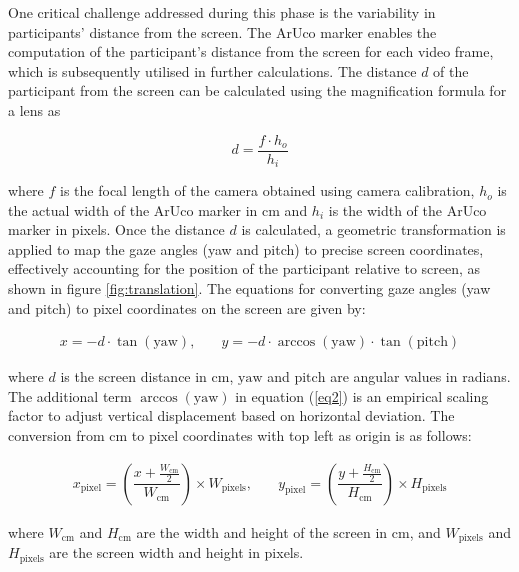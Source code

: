 \documentclass[10pt,a4paper,twoside]{article}
\begin{document}
One critical challenge addressed during this phase is the variability in participants' distance from the screen. The ArUco marker enables the computation of the participant's distance from the screen for each video frame, which is subsequently utilised in further calculations. The distance $d$ of the participant from the screen can be calculated using the magnification formula for a lens as

\begin{equation}
\label{eq1}
    d = \frac{f \cdot h_o}{h_i}
\end{equation}

where $f$ is the focal length of the camera obtained using camera calibration, $h_o$ is the actual width of the ArUco marker in cm and $h_i$ is the width of the ArUco marker in pixels. Once the distance $d$ is calculated, a geometric transformation is applied to map the gaze angles (yaw and pitch) to precise screen coordinates, effectively accounting for the position of the participant relative to screen, as shown in figure \ref{fig:translation}. The equations for converting gaze angles (yaw and pitch) to pixel coordinates on the screen are given by:

\begin{equation}
\begin{array}{ll}
    x = -d \cdot \tan(\text{yaw}), & \quad
    y = -d \cdot \arccos(\text{yaw}) \cdot \tan(\text{pitch})
\end{array}
\label{eq2}
\end{equation}

where \( d \) is the screen distance in cm, \( \text{yaw} \) and \( \text{pitch} \) are angular values in radians. The additional term $\arccos(\text{yaw})$ in equation (\ref{eq2}) is an empirical scaling factor to adjust vertical displacement based on horizontal deviation. The conversion from cm to pixel coordinates with top left as origin is as follows:

\begin{equation}
\begin{array}{ll}
    x_{\text{pixel}} = \left( \dfrac{x + \frac{W_{\text{cm}}}{2}}{W_{\text{cm}}} \right) \times W_{\text{pixels}}, & \quad
    y_{\text{pixel}} = \left( \dfrac{y + \frac{H_{\text{cm}}}{2}}{H_{\text{cm}}} \right) \times H_{\text{pixels}}
\end{array}
\label{eq3}
\end{equation}

where \( W_{\text{cm}} \) and \( H_{\text{cm}} \) are the width and height of the screen in cm, and \( W_{\text{pixels}} \) and \( H_{\text{pixels}} \) are the screen width and height in pixels.
\end{document}

